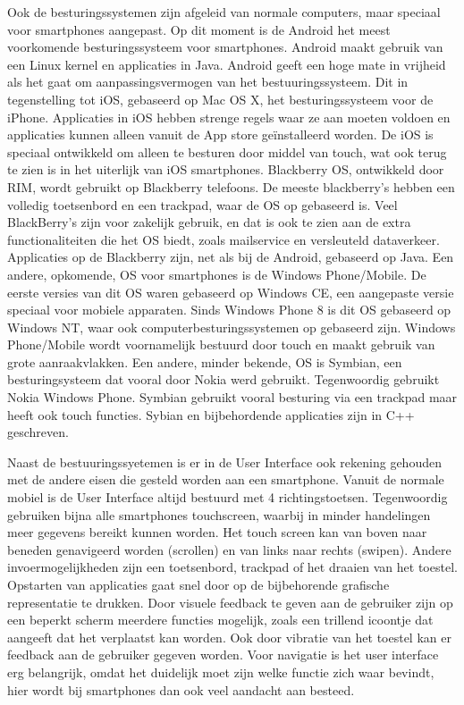 Ook de besturingssystemen zijn afgeleid van normale computers, maar speciaal voor smartphones aangepast. Op dit moment is de Android het meest voorkomende besturingssysteem voor smartphones. Android maakt gebruik van een Linux kernel en applicaties in Java. Android geeft een hoge mate in vrijheid als het gaat om aanpassingsvermogen van het bestuuringssysteem. Dit in tegenstelling tot iOS, gebaseerd op Mac OS X, het besturingssysteem voor de iPhone. Applicaties in iOS hebben strenge regels waar ze aan moeten voldoen en applicaties kunnen alleen vanuit de App store geïnstalleerd worden. De iOS is speciaal ontwikkeld om alleen te besturen door middel van touch, wat ook terug te zien is in het uiterlijk van iOS smartphones. Blackberry OS, ontwikkeld door RIM, wordt gebruikt op Blackberry telefoons. De meeste blackberry's hebben een volledig toetsenbord en een trackpad, waar de OS op gebaseerd is. Veel BlackBerry's zijn voor zakelijk gebruik, en dat is ook te zien aan de extra functionaliteiten die het OS biedt, zoals mailservice en versleuteld dataverkeer. Applicaties op de Blackberry zijn, net als bij de Android, gebaseerd op Java. Een andere, opkomende, OS voor smartphones is de Windows Phone/Mobile. De eerste versies van dit OS waren gebaseerd op Windows CE, een aangepaste versie speciaal voor mobiele apparaten. Sinds Windows Phone 8 is dit OS gebaseerd op Windows NT, waar ook computerbesturingssystemen op gebaseerd zijn. Windows Phone/Mobile wordt voornamelijk bestuurd door touch en maakt gebruik van grote aanraakvlakken. Een andere, minder bekende, OS is Symbian, een besturingsysteem dat vooral door Nokia werd gebruikt. Tegenwoordig gebruikt Nokia Windows Phone. Symbian gebruikt vooral besturing via een trackpad maar heeft ook touch functies. Sybian en bijbehordende applicaties zijn in C++ geschreven.

Naast de bestuuringssyetemen is er in de User Interface ook rekening gehouden met de andere eisen die gesteld worden aan een smartphone. Vanuit de normale mobiel is de User Interface altijd bestuurd met 4 richtingstoetsen. Tegenwoordig gebruiken bijna alle smartphones touchscreen, waarbij in minder handelingen meer gegevens bereikt kunnen worden. Het touch screen kan van boven naar beneden genavigeerd worden (scrollen) en van links naar rechts (swipen). Andere invoermogelijkheden zijn een toetsenbord, trackpad of het draaien van het toestel. Opstarten van applicaties gaat snel door op de bijbehorende grafische representatie te drukken. Door visuele feedback te geven aan de gebruiker zijn op een beperkt scherm meerdere functies mogelijk, zoals een trillend icoontje dat aangeeft dat het verplaatst kan worden. Ook door vibratie van het toestel kan er feedback aan de gebruiker gegeven worden. Voor navigatie is het user interface erg belangrijk, omdat het duidelijk moet zijn welke functie zich waar bevindt, hier wordt bij smartphones dan ook veel aandacht aan besteed. 


